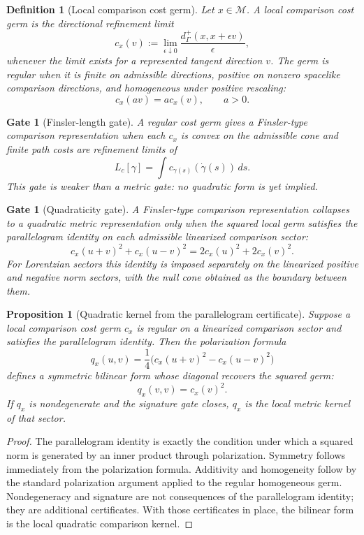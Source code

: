 \documentclass[11pt]{article}
\newtheorem{proposition}[theorem]{Proposition}
\newtheorem{definition}[theorem]{Definition}
\newtheorem{gate}[theorem]{Gate}
\theoremstyle{remark}
\newcommand{\G}{\Gamma}
\newcommand{\Mgeom}{\mathcal M}
\begin{document}
\begin{definition}[Local comparison cost germ]
Let \(x\in\Mgeom\).  A local comparison cost germ is the directional refinement limit
\[
        c_x(v):=
        \lim_{\epsilon\downarrow0}
        \frac{d^+_\G(x,x+\epsilon v)}{\epsilon},
\]
whenever the limit exists for a represented tangent direction \(v\).  The germ is \emph{regular} when it is finite on admissible directions, positive on nonzero spacelike comparison directions, and homogeneous under positive rescaling:
\[
        c_x(av)=a c_x(v),\qquad a>0.
\]
\end{definition}

\begin{gate}[Finsler-length gate]
A regular cost germ gives a Finsler-type comparison representation when each \(c_x\) is convex on the admissible cone and finite path costs are refinement limits of
\[
        L_c[\gamma]=\int c_{\gamma(s)}(\dot\gamma(s))\,ds.
\]
This gate is weaker than a metric gate: no quadratic form is yet implied.
\end{gate}

\begin{gate}[Quadraticity gate]
A Finsler-type comparison representation collapses to a quadratic metric representation only when the squared local germ satisfies the parallelogram identity on each admissible linearized comparison sector:
\[
        c_x(u+v)^2+c_x(u-v)^2
        =2c_x(u)^2+2c_x(v)^2.
\]
For Lorentzian sectors this identity is imposed separately on the linearized positive and negative norm sectors, with the null cone obtained as the boundary between them.
\end{gate}

\begin{proposition}[Quadratic kernel from the parallelogram certificate]
\label{prop:parallelogram-kernel}
Suppose a local comparison cost germ \(c_x\) is regular on a linearized comparison sector and satisfies the parallelogram identity.  Then the polarization formula
\[
        q_x(u,v)=\frac14\bigl(c_x(u+v)^2-c_x(u-v)^2\bigr)
\]
defines a symmetric bilinear form whose diagonal recovers the squared germ:
\[
        q_x(v,v)=c_x(v)^2.
\]
If \(q_x\) is nondegenerate and the signature gate closes, \(q_x\) is the local metric kernel of that sector.
\end{proposition}

\begin{proof}
The parallelogram identity is exactly the condition under which a squared norm is generated by an inner product through polarization.  Symmetry follows immediately from the polarization formula.  Additivity and homogeneity follow by the standard polarization argument applied to the regular homogeneous germ.  Nondegeneracy and signature are not consequences of the parallelogram identity; they are additional certificates.  With those certificates in place, the bilinear form is the local quadratic comparison kernel.
\end{proof}
\end{document}
